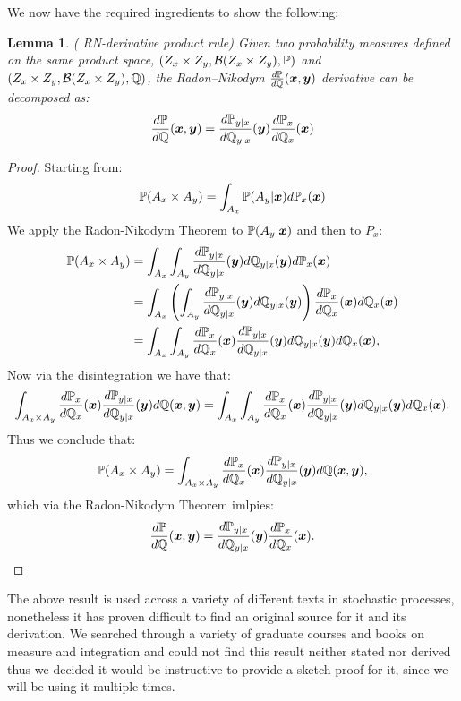 \documentclass[a4paper,12pt,twoside,openright]{report}
\newtheorem{lemma}[theorem]{Lemma}
\theoremstyle{definition}
\begin{document}
We now have the required ingredients to show the following:
\begin{lemma}\label{lemma:rn_des}( RN-derivative product rule)
Given two probability measures defined on the same product space,  $(Z_x \times Z_y, {\mathcal{B}}(Z_x \times Z_y) ,{\mathbb{P}})$ and $(Z_x \times Z_y, {\mathcal{B}}(Z_x \times Z_y) ,{\mathbb{Q}})$, the Radon–Nikodym $\frac{d{\mathbb{P}}}{d{\mathbb{Q}}} ({\bm{x}},{\bm{y}})$ derivative can be decomposed as:
\begin{align}
    \frac{d{\mathbb{P}}}{d{\mathbb{Q}}} ({\bm{x}},{\bm{y}}) = \frac{d{\mathbb{P}}_{y|x}}{d{\mathbb{Q}}_{y|x}}({\bm{y}})\frac{d{\mathbb{P}}_x}{d{\mathbb{Q}}_x}({\bm{x}})
\end{align}
\end{lemma}
\begin{proof}

Starting from:
\begin{align*}
    {\mathbb{P}}(A_x \times A_y) =  \int_{A_x}{\mathbb{P}}(A_y | {\bm{x}})  d{\mathbb{P}}_{x}({\bm{x}}) 
\end{align*}
We apply the Radon-Nikodym Theorem to ${\mathbb{P}}(A_y | {\bm{x}})$ and then to $P_x$:
\begin{align*}
    {\mathbb{P}}(A_x \times A_y) &=  \int_{A_x}\int_{A_y} \frac{d{\mathbb{P}}_{y|x}}{d{\mathbb{Q}}_{y|x}}({\bm{y}}) d{\mathbb{Q}}_{y|x}({\bm{y}}) d{\mathbb{P}}_{x}({\bm{x}}) \\
     &= \int_{A_x}\left(\int_{A_y} \frac{d{\mathbb{P}}_{y|x}}{d{\mathbb{Q}}_{y|x}}({\bm{y}}) d{\mathbb{Q}}_{y|x}({\bm{y}})\right) \frac{d{\mathbb{P}}_{x}}{d{\mathbb{Q}}_{x}}({\bm{x}})d{\mathbb{Q}}_{x}({\bm{x}}) \\
      &= \int_{A_x}\int_{A_y}\frac{d{\mathbb{P}}_{x}}{d{\mathbb{Q}}_{x}}({\bm{x}})\frac{d{\mathbb{P}}_{y|x}}{d{\mathbb{Q}}_{y|x}}({\bm{y}}) d{\mathbb{Q}}_{y|x}({\bm{y}}) d{\mathbb{Q}}_{x}({\bm{x}}),
\end{align*}
Now  via the disintegration we have that:
\begin{align*}
  \int_{A_x \times A_y} \frac{d{\mathbb{P}}_{x}}{d{\mathbb{Q}}_{x}}({\bm{x}})\frac{d{\mathbb{P}}_{y|x}}{d{\mathbb{Q}}_{y|x}}({\bm{y}}) d{\mathbb{Q}}({\bm{x}},{\bm{y}}) = \int_{A_x}\int_{A_y}\frac{d{\mathbb{P}}_{x}}{d{\mathbb{Q}}_{x}}({\bm{x}})\frac{d{\mathbb{P}}_{y|x}}{d{\mathbb{Q}}_{y|x}}({\bm{y}}) d{\mathbb{Q}}_{y|x}({\bm{y}}) d{\mathbb{Q}}_{x}({\bm{x}}).
\end{align*}
Thus we conclude that:
\begin{align*}
    {\mathbb{P}}(A_x \times A_y) = \int_{A_x \times A_y} \frac{d{\mathbb{P}}_{x}}{d{\mathbb{Q}}_{x}}({\bm{x}})\frac{d{\mathbb{P}}_{y|x}}{d{\mathbb{Q}}_{y|x}}({\bm{y}}) d{\mathbb{Q}}({\bm{x}},{\bm{y}}), 
\end{align*}
which via the Radon-Nikodym Theorem imlpies:
\begin{align*}
    \frac{d{\mathbb{P}}}{d{\mathbb{Q}}} ({\bm{x}},{\bm{y}}) = \frac{d{\mathbb{P}}_{y|x}}{d{\mathbb{Q}}_{y|x}}({\bm{y}})\frac{d{\mathbb{P}}_x}{d{\mathbb{Q}}_x}({\bm{x}}).
\end{align*}
\end{proof}
The above result is used across a variety of different texts in stochastic processes, nonetheless it has proven difficult to find an original source for it and its derivation. We searched through a variety of graduate courses and books on measure and integration and could not find this result neither stated nor derived thus we decided it would be instructive to provide a sketch proof for it, since we will be using it multiple times.
\end{document}
